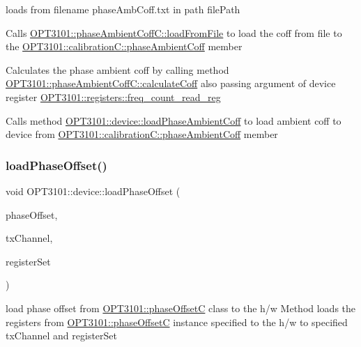 \begin{DoxyItemize}
\item loads from filename phase\+Amb\+Coff.\+txt in path file\+Path
\item Calls \mbox{\hyperlink{class_o_p_t3101_1_1phase_ambient_coff_c_a41db9882facdbf3b437dcb54958b5763}{O\+P\+T3101\+::phase\+Ambient\+Coff\+C\+::load\+From\+File}} to load the coff from file to the \mbox{\hyperlink{class_o_p_t3101_1_1calibration_c_ab69d912cc3cad353abeb73d7a95b7428}{O\+P\+T3101\+::calibration\+C\+::phase\+Ambient\+Coff}} member
\item Calculates the phase ambient coff by calling method \mbox{\hyperlink{class_o_p_t3101_1_1phase_ambient_coff_c_ac8f4dfff191b0adc7be044f39500e242}{O\+P\+T3101\+::phase\+Ambient\+Coff\+C\+::calculate\+Coff}} also passing argument of device register \mbox{\hyperlink{class_o_p_t3101_1_1registers_a0d343738560c0bc418f34b458735a811}{O\+P\+T3101\+::registers\+::freq\+\_\+count\+\_\+read\+\_\+reg}}
\item Calls method \mbox{\hyperlink{class_o_p_t3101_1_1device_aa34206319a66be86de29789a1c24e3f7}{O\+P\+T3101\+::device\+::load\+Phase\+Ambient\+Coff}} to load ambient coff to device from \mbox{\hyperlink{class_o_p_t3101_1_1calibration_c_ab69d912cc3cad353abeb73d7a95b7428}{O\+P\+T3101\+::calibration\+C\+::phase\+Ambient\+Coff}} member 
\end{DoxyItemize}\mbox{\label{class_o_p_t3101_1_1device_a941591aefa8b4c9b7436ac8f216938ed}} 
\subsubsection{\texorpdfstring{load\+Phase\+Offset()}{loadPhaseOffset()}}
{\footnotesize\ttfamily void O\+P\+T3101\+::device\+::load\+Phase\+Offset (\begin{DoxyParamCaption}\item[{\mbox{\hyperlink{class_o_p_t3101_1_1phase_offset_c}{O\+P\+T3101\+::phase\+OffsetC}} $\ast$}]{phase\+Offset,  }\item[{uint8\+\_\+t}]{tx\+Channel,  }\item[{char}]{register\+Set }\end{DoxyParamCaption})}



load phase offset from \mbox{\hyperlink{class_o_p_t3101_1_1phase_offset_c}{O\+P\+T3101\+::phase\+OffsetC}} class to the h/w Method loads the registers from \mbox{\hyperlink{class_o_p_t3101_1_1phase_offset_c}{O\+P\+T3101\+::phase\+OffsetC}} instance specified to the h/w to specified tx\+Channel and register\+Set 


